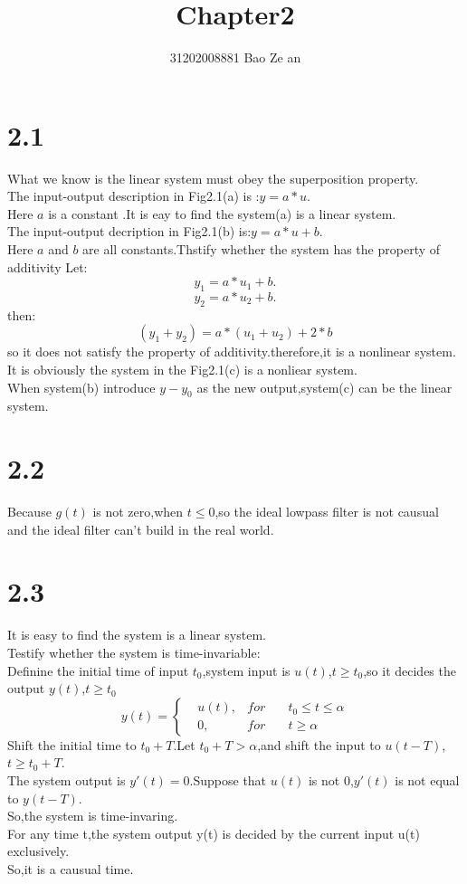 \documentclass{article}
\title{Chapter2}
\author{31202008881        \quad \quad \quad
          Bao Ze an}
\begin{document}
\setlength{\parindent}{2em}
\maketitle
\section*{2.1}
What we know is the linear system must obey the superposition property.\\
The input-output description in Fig2.1(a) is :$y=a*u$.\\
Here $a$ is a constant .It is eay to find the system(a) is a linear system.\\
The input-output decription in Fig2.1(b) is:$y=a*u+b$.\\
Here $a$ and $b$ are all constants.Thstify whether the system has the property of additivity
Let:
\[y_1=a*u_1+b.\]
\[y_2=a*u_2+b.\]
then:
\[(y_1+y_2)=a*(u_1+u_2)+2*b\]
so it does not satisfy the property of additivity.therefore,it is a nonlinear system.\\
It is obviously the system in the Fig2.1(c) is a nonliear system.\\
When system(b) introduce $y-y_0$ as the new output,system(c) can be the linear system.\\

\section*{2.2}
Because $g(t)$ is not zero,when $t \leq 0$,so the ideal lowpass filter is not causual and the ideal filter 
can't build in the real world.\\

\section*{2.3}
It is easy to find the system is a linear system.\\
Testify whether the system is time-invariable:\\
Definine the initial time of input $t_0$,system input is $u(t)$,$t \geq t_0$,so it decides the output $y(t)$,$t \geq t_0$ \\
\[y(t)=\left\{
\begin{aligned}
&u(t)  , &for& \quad t_0 \leq t \leq \alpha \\
&0  , &for& \quad t \geq \alpha
\end{aligned}
\right.\]
Shift the initial time to $t_0+T$.Let $t_0+T> \alpha$,and shift the input to $u(t-T)$,$t \geq t_0+T$.\\
The system output is $y'(t)=0$.Suppose that $u(t)$ is not 0,$y'(t)$ is not equal to $y(t-T)$.\\
So,the system is time-invaring.\\
For any time t,the system output y(t) is decided by the current input u(t) exclusively.\\
So,it is a causual time.\\
\end{document}
